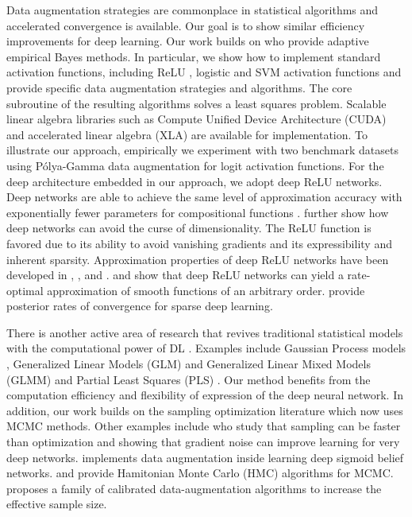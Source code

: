 \documentclass[ba]{imsart}
\numberwithin{equation}{section}
\theoremstyle{plain}
\begin{document}
\fi


Data augmentation strategies are commonplace in statistical algorithms and  accelerated convergence  \citep{nesterov1983method, green1984iteratively} is available. Our goal is to show similar efficiency improvements  for deep learning.  Our work builds on \citet{deng2019adaptive} who provide adaptive empirical Bayes methods. In particular, we show how to implement standard activation functions, including ReLU \citep{polson2018posterior}, logistic \citep{zhou2012beta, hernandez2015probabilistic} and SVM \citep{mallick2005bayesian} activation functions and provide specific data augmentation strategies and algorithms. The core subroutine of the resulting algorithms solves a least squares problem. Scalable linear algebra libraries such as Compute Unified Device Architecture (CUDA) and accelerated linear algebra (XLA) are available for implementation.   To  illustrate our approach, empirically  we experiment with two benchmark datasets using P\'{o}lya-Gamma data augmentation for logit activation functions. For the deep architecture embedded in our approach, we adopt deep ReLU networks. Deep  networks are able to achieve  the same level of approximation accuracy with exponentially fewer parameters for compositional functions \citep{mhaskar2017and}.  \citet{poggio2017and} further show how deep networks can avoid the curse of dimensionality. The ReLU function is favored due to its ability to avoid vanishing gradients and its expressibility and  inherent sparsity. Approximation properties of deep ReLU networks have been developed in \citet{montufar2014number}, \citet{telgarsky2017neural}, and \citet{liang2016deep}.  \citet{yarotsky2017error}  and \citet{schmidt2017nonparametric} show that deep ReLU networks can yield a rate-optimal approximation of smooth functions of an arbitrary order.  \citet{polson2018posterior} provide posterior rates of convergence for sparse deep learning.




There is  another active area of research that revives traditional statistical models with the computational power of DL \citep{bhadra2021merging}. Examples include   Gaussian Process models \citep{higdon2008computer, gramacy2008bayesian}, Generalized Linear Models (GLM) and Generalized  Linear Mixed Models (GLMM) \citep{tran2020bayesian}  and Partial Least Squares (PLS) \citep{polson2021deep}.  Our method benefits from the computation efficiency and flexibility of expression  of the deep neural network. In addition, our work builds on the sampling optimization literature \citep{pincus1968letter, pincus1970letter} which now uses MCMC methods.  Other examples include \citet{ma2018sampling} who study that sampling can be faster than optimization and \citet{neelakantan2015adding} showing that gradient noise can improve learning for very deep networks. \citet{gan2015learning} implements data augmentation inside learning deep sigmoid belief networks. \citet{neal2011mcmc} and \citet{chen2014stochastic} provide Hamitonian Monte Carlo (HMC) algorithms for MCMC.  \citet{duan2018scaling} proposes a family of calibrated data-augmentation algorithms to increase the effective sample size. 
\end{document}
